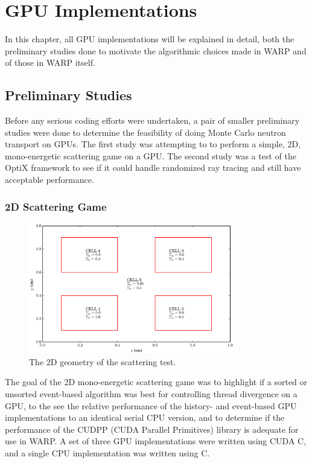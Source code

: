 \chapter{GPU Implementations}
\label{chap:imp}

In this chapter, all GPU implementations will be explained in detail, both the preliminary studies done to motivate the algorithmic choices made in WARP and of those in WARP itself.

\section{Preliminary Studies}
\label{sec:prelim}

Before any serious coding efforts were undertaken, a pair of smaller preliminary studies were done to determine the feasibility of doing Monte Carlo neutron transport on GPUs.  The first study was attempting to to perform a simple, 2D, mono-energetic scattering game on a GPU.  The second study was a test of the OptiX framework to see if it could handle randomized ray tracing and still have acceptable performance.

\subsection{2D Scattering Game}

\begin{figure}[h!] 
  \centering
    \includegraphics[width=0.8\textwidth]{graphics/prelim_geom.eps}
     \caption{The 2D geometry of the scattering test. \label{prelim_geom} }
\end{figure}

The goal of the 2D mono-energetic scattering game was to highlight if a sorted or unsorted event-based algorithm was best for controlling thread divergence on a GPU, to the see the relative performance of the history- and event-based GPU implementations to an identical serial CPU version, and to determine if the performance of the CUDPP (CUDA Parallel Primitives) library is adequate for use in WARP.   A set of three GPU implementations were written using CUDA C, and a single CPU implementation was written using C.

